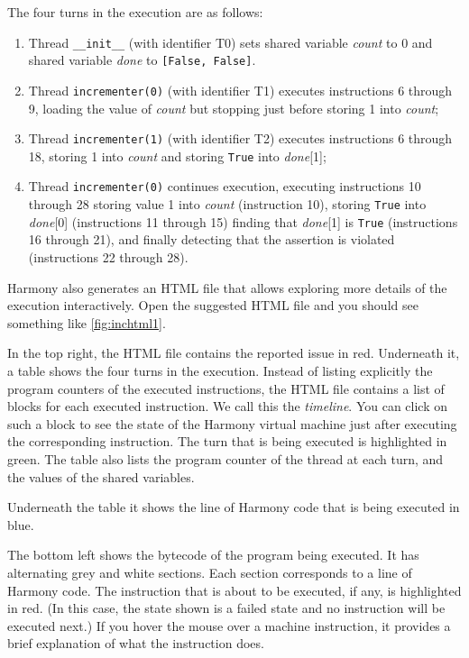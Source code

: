 \documentclass{report}
\begin{document}
The four turns in the execution are as follows:

\begin{enumerate}
\item Thread \texttt{\_\_init\_\_} (with identifier T0)
sets shared variable \textit{count} to 0 and
shared variable \textit{done} to \texttt{[False, False]}.
\item Thread \texttt{incrementer(0)} (with identifier T1)
executes instructions 6 through 9, loading the value of
\textit{count} but stopping just before storing 1 into \textit{count};
\item Thread \texttt{incrementer(1)} (with identifier T2)
executes instructions 6 through 18, storing 1 into
\textit{count} and storing \texttt{True} into \textit{done}[1];
\item Thread \texttt{incrementer(0)}
continues execution, executing instructions 10 through 28
storing value 1 into \textit{count} (instruction 10),
storing \texttt{True} into \textit{done}[0] (instructions 11 through 15)
finding that \textit{done}[1] is \texttt{True} (instructions 16 through 21),
and finally detecting that the assertion is violated
(instructions 22 through 28).
\end{enumerate}

Harmony also generates an HTML file that allows exploring more details
of the execution interactively.
Open the suggested HTML file and you should see something like
\autoref{fig:inchtml1}.

In the top right, the HTML file contains the reported issue in red.
Underneath it, a table shows the four turns in the execution.
Instead of listing explicitly the program counters of the executed
instructions, the HTML file contains a list of blocks for each
executed instruction.  We call this the \emph{timeline}.
You can click on such a block to see the state of the Harmony
virtual machine just after executing the corresponding instruction.
The turn that is being executed is highlighted in green.
The table also lists the program counter of the thread at each turn,
and the values of the shared variables.

Underneath the table it shows the line of Harmony code that is being
executed in blue.

The bottom left shows
the bytecode of the program being executed.  It has alternating
grey and white sections.  Each section corresponds to a line of
Harmony code.  The instruction that is about to be executed,
if any, is highlighted in red.  (In this case, the state shown
is a failed state and no instruction will be executed next.)
If you hover the mouse over a machine instruction, it provides a
brief explanation of what the instruction does.
\end{document}
